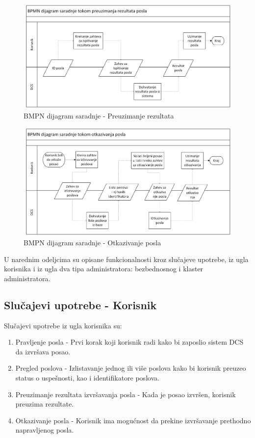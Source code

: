 \documentclass[12pt,oneside]{memoir}
\begin{document}
\begin{figure}[!ht]
  \centering
  \includegraphics[width=1\textwidth]{./images/BPMN_dijagram_saradnje_korisnik_dsc_rezultati.png}
  \caption{BMPN dijagram saradnje - Preuzimanje rezultata}
  \label{fig:bpmn_korisnik_rez}
\end{figure}

\begin{figure}[!ht]
  \centering
  \includegraphics[width=1\textwidth]{./images/BPMN_dijagram_saradnje_otkazivanje.png}
  \caption{BMPN dijagram saradnje - Otkazivanje posla}
  \label{fig:bpmn_otkazivanje}
\end{figure}

U narednim odeljcima su opisane funkcionalnosti kroz slučajeve upotrebe, iz ugla korisnika i iz ugla dva tipa administratora: bezbednosnog i klaster administratora.

\subsection{Slučajevi upotrebe - Korisnik}

Slučajevi upotrebe iz ugla korisnika su:
\begin{enumerate}
\item Pravljenje posla - Prvi korak koji korisnik radi kako bi zaposlio sistem DCS da izvršava posao.
\item Pregled poslova - Izlistavanje jednog ili više poslova kako bi korisnik preuzeo status o uspešnosti, kao i identifikatore poslova.
\item Preuzimanje rezultata izvršavanja posla - Kada je posao izvršen, korisnik preuzima rezultate.
\item Otkazivanje posla - Korisnik ima mogućnost da prekine izvršavanje prethodno napravljenog posla.
\end{enumerate}
\end{document}
